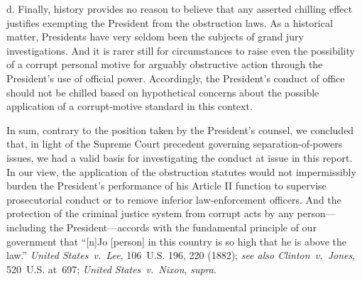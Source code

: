 d. Finally, history provides no reason to believe that any asserted chilling effect justifies exempting the President from the obstruction laws.
As a historical matter, Presidents have very seldom been the subjects of grand jury investigations.
And it is rarer still for circumstances to raise even the possibility of a corrupt personal motive for arguably obstructive action through the President's use of official power.
Accordingly, the President's conduct of office should not be chilled based on hypothetical concerns about the possible application of a corrupt-motive standard in this context.

\hr

In sum, contrary to the position taken by the President's counsel, we concluded that, in light of the Supreme Court precedent governing separation-of-powers issues, we had a valid basis for investigating the conduct at issue in this report.
In our view, the application of the obstruction statutes would not impermissibly burden the President's performance of his Article II function to supervise prosecutorial conduct or to remove inferior law-enforcement officers.
And the protection of the criminal justice system from corrupt acts by any person---including the President---accords with the fundamental principle of our government that ``[n]Jo [person] in this country is so high that he is above the law.''
\textit{United States~v.\ Lee}, 106~U.S. 196, 220 (1882);
\textit{see also Clinton~v.\ Jones}, 520~U.S. at~697;
\textit{United States~v.\ Nixon}, \textit{supra}.
